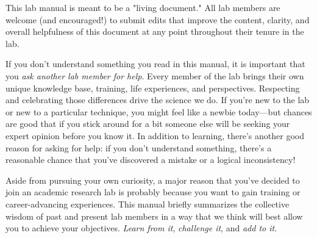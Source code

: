 \documentclass{tufte-book} %
\begin{document}
This lab manual is meant to be a "living document." All lab members are welcome (and encouraged!) to submit edits that improve the content, clarity, and overall helpfulness of this document at any point throughout their tenure in the lab.


\noindent {} If you don't understand something you
read in this manual, it is important that you \textit{ask another lab
  member for help}.  Every member of the lab brings their own unique
knowledge base, training, life experiences, and perspectives.
Respecting and celebrating those differences drive the science we do.
If you're new to the lab or new to a particular technique, you might
feel like a newbie today---but chances are good that if you stick
around for a bit someone else will be seeking your expert opinion
before you know it.  In addition to learning, there's another good
reason for asking for help: if you don't understand something, there's
a reasonable chance that you've discovered a mistake or a logical
inconsistency!

Aside from pursuing your own curiosity, a major reason that you've
decided to join an academic research lab is probably because you want
to gain training or career-advancing experiences.  This manual briefly
summarizes the collective wisdom of past and present lab members in a
way that we think will best allow you to achieve your objectives.
\textit{Learn from it}, \textit{challenge it}, and \textit{add to it}.

\end{document}
